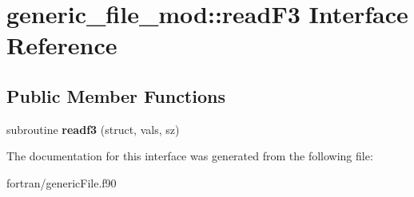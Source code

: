 \hypertarget{interfacegeneric__file__mod_1_1read_f3}{}\section{generic\+\_\+file\+\_\+mod\+:\+:read\+F3 Interface Reference}
\label{interfacegeneric__file__mod_1_1read_f3}
\subsection*{Public Member Functions}
\begin{DoxyCompactItemize}
\item 
\mbox{\label{interfacegeneric__file__mod_1_1read_f3_a4bed5f9aadb961fd982660cb0e51615e}} 
subroutine {\bfseries readf3} (struct, vals, sz)
\end{DoxyCompactItemize}


The documentation for this interface was generated from the following file\+:\begin{DoxyCompactItemize}
\item 
fortran/generic\+File.\+f90\end{DoxyCompactItemize}
